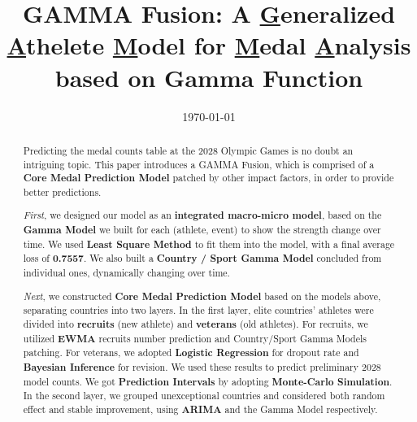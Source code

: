 \documentclass{mcmthesis}
\title{GAMMA Fusion: A \underline{G}eneralized \underline{A}thelete \underline{M}odel for \underline{M}edal \underline{A}nalysis based on Gamma Function}
\date{\today}
\begin{document}
\begin{abstract}

Predicting the medal counts table at the 2028 Olympic Games is no doubt an intriguing topic. This paper introduces a GAMMA Fusion, which is comprised of a \textbf{Core Medal Prediction Model} patched by other impact factors, in order to provide better predictions. 

\textit{First}, we designed our model as an \textbf{integrated macro-micro model}, based on the \textbf{Gamma Model} we built for each (athlete, event) to show the strength change over time. We used \textbf{Least Square Method} to fit them into the model, with a final average loss of \textbf{0.7557}. We also built a \textbf{Country / Sport Gamma Model} concluded from individual ones, dynamically changing over time. 

\textit{Next}, we constructed \textbf{Core Medal Prediction Model} based on the models above, separating countries into two layers. In the first layer, elite countries' athletes were divided into \textbf{recruits} (new athlete) and \textbf{veterans} (old athletes). For recruits, we utilized \textbf{EWMA} recruits number prediction and Country/Sport Gamma Models patching. For veterans, we adopted \textbf{Logistic Regression} for dropout rate and \textbf{Bayesian Inference} for revision. We used these results to predict preliminary 2028 model counts. We got \textbf{Prediction Intervals} by adopting \textbf{Monte-Carlo Simulation}. In the second layer, we grouped unexceptional countries and considered both random effect and stable improvement, using \textbf{ARIMA} and the Gamma Model respectively.



\end{abstract}
\end{document}
